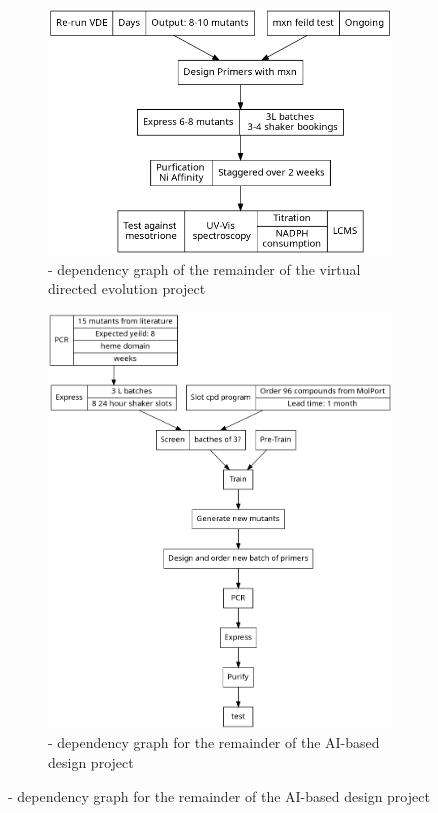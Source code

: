 \documentclass[10pt]{beamer}
\begin{document}
\begin{frame}
	\begin{figure}
	\begin{subfigure}{0.49\linewidth} 
	\includegraphics[width=\textwidth]{figs/evoG.png}
		\caption{\label{evoG} - dependency graph of the remainder of the virtual directed evolution project}
	\end{subfigure}
	\begin{subfigure}{0.49\linewidth} 
	\includegraphics[width=\textwidth]{figs/rioG.png}
		\caption{\label{rioG} - dependency graph for the remainder of the AI-based design project}
	\end{subfigure}
	\end{figure}
\end{frame}
\end{document}
